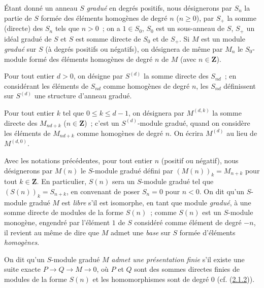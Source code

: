 \begin{notation}[2.1.1]
\label{II.2.1.1-fr}
Étant donné un anneau $S$ \emph{gradué} en degrés positifs, nous désignerons
par $S_n$ la partie de $S$ formée des éléments homogènes de degré $n$
($n\geq0$), par $S_+$ la somme (directe) des $S_n$ tels que $n>0$~; on a
$1\in S_0$, $S_0$ est un sous-anneau de $S$, $S_+$ un idéal gradué de $S$ et
$S$ est somme directe de $S_0$ et de $S_+$. Si $M$ est un module
\emph{gradué} sur $S$ (à degrés positifs ou négatifs), on désignera de même par
$M_n$ le $S_0$-module formé des éléments homogènes de degré $n$ de $M$ (avec
$n\in\mathbf{Z}$).

Pour tout entier $d>0$, on désigne par $S^{(d)}$ la somme directe des
$S_{nd}$~; en considérant les éléments de $S_{nd}$ comme homogènes de degré
$n$, les $S_{nd}$ définissent sur $S^{(d)}$ une structure d'anneau gradué.

Pour tout entier $k$ tel que $0\leq k\leq d-1$, on désignera par
$M^{(d,k)}$ la somme directe
des $M_{nd+k}$ ($n\in\mathbf{Z}$)~; c'est un $S^{(d)}$-module gradué, quand
on considère les éléments de $M_{nd+k}$ comme homogènes de degré $n$. On
écrira $M^{(d)}$ au lieu de $M^{(d,0)}$.

Avec les notations précédentes, pour tout entier $n$ (positif ou négatif),
nous désignerons par $M(n)$ le $S$-module gradué défini par
$(M(n))_k=M_{n+k}$ pour tout $k\in\mathbf{Z}$. En particulier, $S(n)$ sera
un $S$-module gradué tel que $(S(n))_k=S_{n+k}$, en convenant de poser
$S_n=0$ pour $n<0$. On dit qu'un $S$-module gradué $M$ est \emph{libre}
s'il est isomorphe, en tant que module \emph{gradué}, à une somme directe de
modules de la forme $S(n)$~; comme $S(n)$ est un $S$-module monogène,
engendré par l'élément $1$ de $S$ considéré comme élément de degré $-n$, il
revient au même de dire que $M$ admet une \emph{base} sur $S$ formée
d'éléments \emph{homogènes}.

On dit qu'un $S$-module gradué $M$ \emph{admet une présentation finie} s'il
existe une suite exacte $P\to Q\to M\to0$, où $P$ et $Q$ sont des sommes
directes finies de modules de la forme $S(n)$ et les homomorphismes sont de
degré $0$ (cf. (\hyperref[II.2.1.2-fr]{2.1.2})).
\end{notation}

